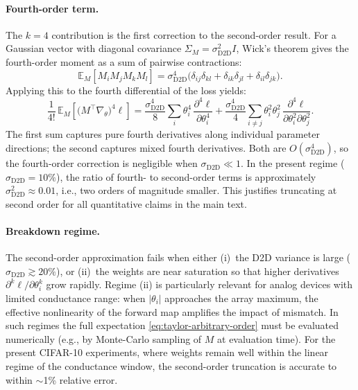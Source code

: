 \paragraph{Fourth-order term.} The $k=4$ contribution is the first correction to the second-order result. For a Gaussian vector with diagonal covariance $\Sigma_M=\sigma_{\text{D2D}}^2 I$, Wick's theorem gives the fourth-order moment as a sum of pairwise contractions:
\begin{equation}
    \mathbb{E}_M[M_iM_jM_kM_l] = \sigma_{\text{D2D}}^4\bigl(\delta_{ij}\delta_{kl} + \delta_{ik}\delta_{jl} + \delta_{il}\delta_{jk}\bigr).
    \label{eq:wick-fourth}
\end{equation}
Applying this to the fourth differential of the loss yields:
\begin{equation}
    \frac{1}{4!}\,\mathbb{E}_M\!\left[\bigl(M^{\top}\nabla_{\theta}\bigr)^{4}\ell\right]
    = \frac{\sigma_{\text{D2D}}^4}{8} \sum_i \theta_i^4 \, \frac{\partial^4 \ell}{\partial\theta_i^4}
    + \frac{\sigma_{\text{D2D}}^4}{4} \sum_{i\neq j} \theta_i^2\theta_j^2 \, \frac{\partial^4 \ell}{\partial\theta_i^2\partial\theta_j^2}.
    \label{eq:fourth-order-explicit}
\end{equation}
The first sum captures pure fourth derivatives along individual parameter directions; the second captures mixed fourth derivatives. Both are $O(\sigma_{\text{D2D}}^4)$, so the fourth-order correction is negligible when $\sigma_{\text{D2D}}\ll 1$. In the present regime ($\sigma_{\text{D2D}}=10\%$), the ratio of fourth- to second-order terms is approximately $\sigma_{\text{D2D}}^2\approx 0.01$, i.e., two orders of magnitude smaller. This justifies truncating at second order for all quantitative claims in the main text.

\paragraph{Breakdown regime.} The second-order approximation fails when either (i)~the D2D variance is large ($\sigma_{\text{D2D}}\gtrsim 20\%$), or (ii)~the weights are near saturation so that higher derivatives $\partial^k\ell/\partial\theta_i^k$ grow rapidly. Regime (ii) is particularly relevant for analog devices with limited conductance range: when $|\theta_i|$ approaches the array maximum, the effective nonlinearity of the forward map amplifies the impact of mismatch. In such regimes the full expectation \eqref{eq:taylor-arbitrary-order} must be evaluated numerically (e.g., by Monte-Carlo sampling of $M$ at evaluation time). For the present CIFAR-10 experiments, where weights remain well within the linear regime of the conductance window, the second-order truncation is accurate to within $\sim$1\% relative error.

